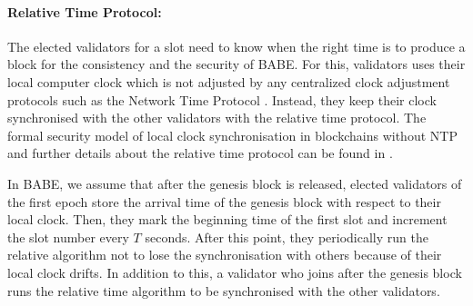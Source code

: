 


\paragraph{Relative Time Protocol:}

The elected validators for a slot need to know when the right time is to produce a block for the consistency and the security of BABE. For this, validators uses their local computer clock which is not adjusted by  any centralized clock adjustment protocols such as the Network Time Protocol \cite{ntp}. Instead, they keep their clock synchronised with the other validators with the relative time protocol. 
The formal security model of local clock synchronisation in blockchains without NTP and further details about the relative time protocol can be found in \cite{consensusonclock}.

In BABE, we assume that after the genesis block is released, elected validators of the first epoch store the arrival time of the genesis block with respect to their local clock. Then, they mark the beginning
 time of the first slot and increment
the slot number every $ T $ seconds. After this point,  they periodically run the relative algorithm not to lose the synchronisation with others because of their local clock drifts.  In addition to this, a validator who
joins after the genesis block runs the relative time algorithm to be synchronised with the other validators.

